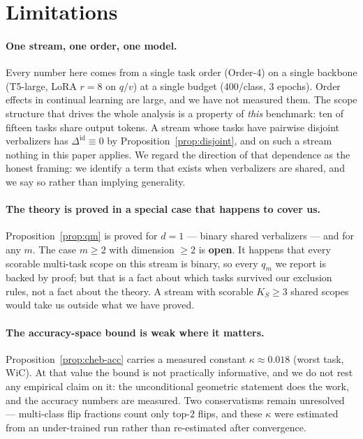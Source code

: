\section{Limitations}
\label{sec:limitations}

\paragraph{One stream, one order, one model.}
Every number here comes from a single task order (Order-4) on a single backbone
(T5-large, LoRA $r{=}8$ on $q/v$) at a single budget ($400$/class, $3$ epochs).
Order effects in continual learning are large, and we have not measured them. The
scope structure that drives the whole analysis is a property of \emph{this}
benchmark: ten of fifteen tasks share output tokens. A stream whose tasks have
pairwise disjoint verbalizers has $\Delta^{\mathrm{id}}\equiv0$ by
Proposition~\ref{prop:disjoint}, and on such a stream nothing in this paper
applies. We regard the direction of that dependence as the honest framing: we
identify a term that exists when verbalizers are shared, and we say so rather than
implying generality.

\paragraph{The theory is proved in a special case that happens to cover us.}
Proposition~\ref{prop:qm} is proved for $d=1$ --- binary shared verbalizers --- and
for any $m$. The case $m\ge2$ with dimension $\ge2$ is \textbf{open}. It happens
that every scorable multi-task scope on this stream is binary, so every $q_m$ we
report is backed by proof; but that is a fact about which tasks survived our
exclusion rules, not a fact about the theory. A stream with scorable $K_S\ge3$
shared scopes would take us outside what we have proved.

\paragraph{The accuracy-space bound is weak where it matters.}
Proposition~\ref{prop:cheb-acc} carries a measured constant
$\kappa\approx0.018$ (worst task, WiC). At that value the bound is not
practically informative, and we do not rest any empirical claim on it: the
unconditional geometric statement does the work, and the accuracy numbers are
measured. Two conservatisms remain unresolved --- multi-class flip fractions count
only top-$2$ flips, and these $\kappa$ were estimated from an under-trained run
rather than re-estimated after convergence.

